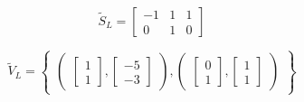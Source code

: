
\begin{center}
	\begin{minipage}{0.3\linewidth}
		\begin{equation*}
			\tilde{S}_L = 
			\begin{bmatrix}
				-1 & 1 & 1 \\
				0 & 1 & 0
			\end{bmatrix}
		\end{equation*}
	\end{minipage}
	\begin{minipage}{0.6\linewidth}
		\begin{equation*}
			\tilde{V}_L =
			\begin{Bmatrix}
			\begin{pmatrix}
				\begin{bmatrix}
					1 \\
					1 
				\end{bmatrix},
				\begin{bmatrix}
					-5 \\
					-3 
				\end{bmatrix}
			\end{pmatrix}, 
			\begin{pmatrix}
				\begin{bmatrix}
					0 \\
					1 
				\end{bmatrix},
				\begin{bmatrix}
					1 \\
					1 
				\end{bmatrix}
			\end{pmatrix}
		\end{Bmatrix}
		\end{equation*}
	\end{minipage}
\end{center}